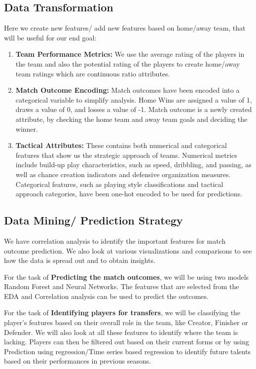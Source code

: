 \documentclass{article}
\begin{document}
\subsection{Data Transformation}
Here we create new features/ add new features based on home/away team, that will be useful for our end goal:

\begin{enumerate}
    \item \textbf{Team Performance Metrics:} 
    We use the average rating of the players in the team and also the potential rating of the players to create home/away team ratings which are continuous ratio attributes.
    \item \textbf{Match Outcome Encoding:} Match outcomes have been encoded into a categorical variable to simplify analysis. Home Wins are assigned a value of 1, draws a value of 0, and losses a value of -1. Match outcome is a newly created attribute, by checking the home team and away team goals and deciding the winner.
    \item \textbf{Tactical Attributes:} These contains both numerical and categorical features that show us the strategic approach of teams. Numerical metrics include build-up play characteristics, such as speed, dribbling, and passing, as well as chance creation indicators and defensive organization measures. Categorical features, such as playing style classifications and tactical approach categories, have been one-hot encoded to be used for predictions.
\end{enumerate}

\subsection{Data Mining/ Prediction Strategy}
We have correlation analysis to identify the important features for match outcome prediction. We also look at various visualizations and comparisons to see how the data is spread out and to obtain insights.

For the task of \textbf{Predicting the match outcomes}, we will be using two models Random Forest and Neural Networks. The features that are selected from the EDA and Correlation analysis can be used to predict the outcomes.

For the task of \textbf{Identifying players for transfers}, we will be classifying the player's features based on their overall
role in the team, like Creator, Finisher or Defender. We will also look at all these features to identify where the team is lacking. Players can then be filtered out based on their current forms or by using Prediction using regression/Time series based regression to identify future talents based on their performances in previous seasons.
\end{document}
